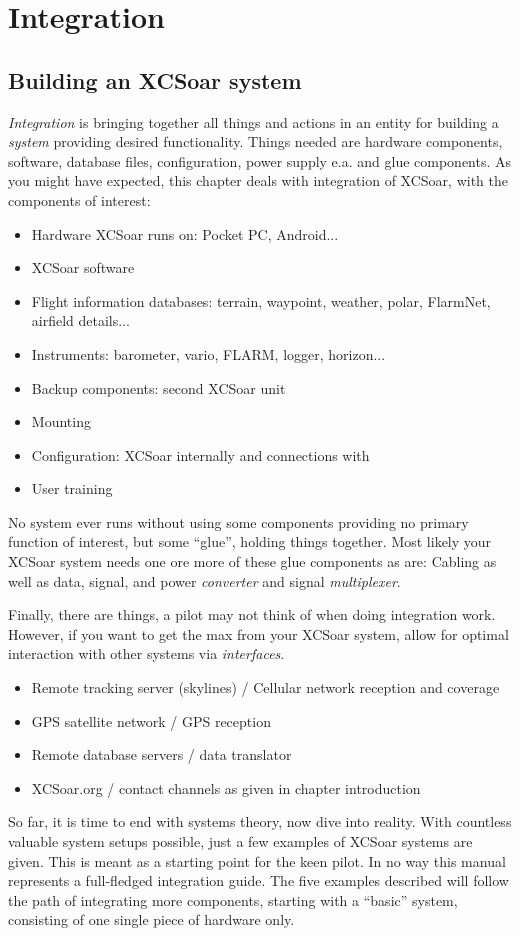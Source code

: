 \chapter{Integration}\label{cha:Integration}

\section{Building an XCSoar system}
\emph{Integration} is bringing together all things and actions in an entity for  
building a \emph{system} providing desired functionality. Things needed are 
hardware components, software, database files, configuration, power supply e.a. 
and glue components. As you might have expected, this chapter deals with 
integration of XCSoar, with the components of interest:
\begin{itemize} 
\item Hardware XCSoar runs on: Pocket PC, Android...
\item XCSoar software
\item Flight information databases: terrain, waypoint, weather, polar, 
FlarmNet, airfield details...
\item Instruments: barometer, vario, FLARM, logger, horizon...
\item Backup components: second XCSoar unit
\item Mounting
\item Configuration: XCSoar internally and connections with
\item User training
\end{itemize}
No system ever runs without using some components providing no primary function 
of interest, but some ``glue'', holding things together.  Most likely your XCSoar
system needs one ore more of these glue components as are:
Cabling as well as data, signal, and power \emph{converter} and signal 
\emph{multiplexer}.

Finally, there are things, a pilot may not think of when doing integration work. 
However, if you want to get the max from your XCSoar system, allow for optimal 
interaction with other systems via \emph{interfaces}.
\begin{itemize}
\item Remote tracking server (skylines) / Cellular network reception and coverage
\item GPS satellite network / GPS reception
\item Remote database servers / data translator
\item XCSoar.org / contact channels as given in chapter introduction
\end{itemize}
So far, it is time to end with systems theory, now dive into reality. With 
countless valuable system setups possible, just a few examples of XCSoar systems 
are given. This is meant as a starting point for the 
keen pilot. In no way this manual represents a full-fledged integration guide.  
The five examples described will follow the path of integrating more components, 
starting with a ``basic'' system, consisting of one single piece of hardware only.

